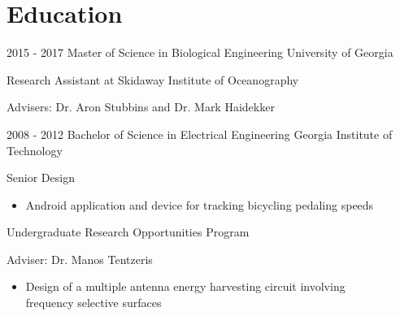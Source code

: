 \documentclass[]{resume}
\begin{document}
\newpage
\section{Education}
\begin{entrylist}
	\entry
	{2015 - 2017}
	{Master of Science in Biological Engineering}
	{University of Georgia}
	{Research Assistant at Skidaway Institute of Oceanography
		\begin{description}
			\item Advisers: Dr. Aron Stubbins and Dr. Mark Haidekker
		\end{description}}
	\entry
	{2008 - 2012}
	{Bachelor of Science in Electrical Engineering}
	{Georgia Institute of Technology}
	{Senior Design
		\begin{itemize}
			\item Android application and device for tracking bicycling pedaling speeds
		\end{itemize}
		Undergraduate Research Opportunities Program
		\begin{description}
			\item Adviser: Dr. Manos Tentzeris
		\end{description}
		\begin{itemize}
			\item Design of a multiple antenna energy harvesting circuit involving\\ frequency selective surfaces \end{itemize}
			      }
			\end{entrylist}
\end{document}
